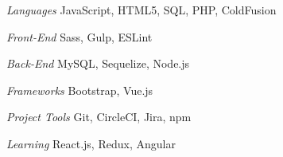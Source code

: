 \begin{minipage}[t]{0.53\textwidth}
\begin{cvskills}

  \cvskill
    {\textit{Languages}} %
    {JavaScript, HTML5, SQL, PHP, ColdFusion} %


 \cvskill
    {\textit{Front-End}} %
    {Sass, Gulp, ESLint} %


  \cvskill
    {\textit{Back-End}} %
    {MySQL, Sequelize, Node.js} %

 
\end{cvskills}
\end{minipage}%
\begin{minipage}[t]{0.47\textwidth}
\begin{cvskills}

  \cvskill
    {\textit{Frameworks}} %
    {Bootstrap, Vue.js} %


  \cvskill
    {\textit{Project Tools}} %
    {Git, CircleCI, Jira, npm} %


  \cvskill
    {\textit{Learning}} %
    {React.js, Redux, Angular} %

\end{cvskills}
\end{minipage}

%

